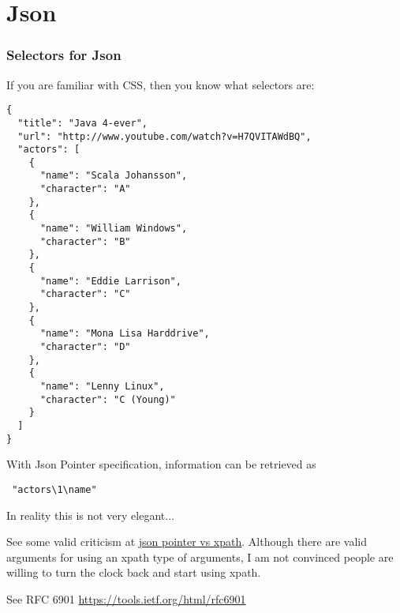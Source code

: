 \chapter{Json}


\subsection{Selectors for Json}

If you are familiar with CSS, then you know what selectors are:

\begin{verbatim}
{
  "title": "Java 4-ever",
  "url": "http://www.youtube.com/watch?v=H7QVITAWdBQ",
  "actors": [
    {
      "name": "Scala Johansson",
      "character": "A"
    },
    {
      "name": "William Windows",
      "character": "B"
    },
    {
      "name": "Eddie Larrison",
      "character": "C"
    },
    {
      "name": "Mona Lisa Harddrive",
      "character": "D"
    },
    {
      "name": "Lenny Linux",
      "character": "C (Young)"
    }
  ]
}

\end{verbatim}

With Json Pointer specification, information can be retrieved as 

\verb+ "actors\1\name" + 

In reality this is not very elegant...

See some valid criticism at \href{http://susanpotter.net/blogs/software/2011/07/why-json-pointer-falls-short/}{json pointer vs xpath}. Although there are valid arguments for using an xpath type of arguments, I am not convinced people are willing 
to turn the clock back and start using xpath.

See RFC 6901 \url{https://tools.ietf.org/html/rfc6901}

